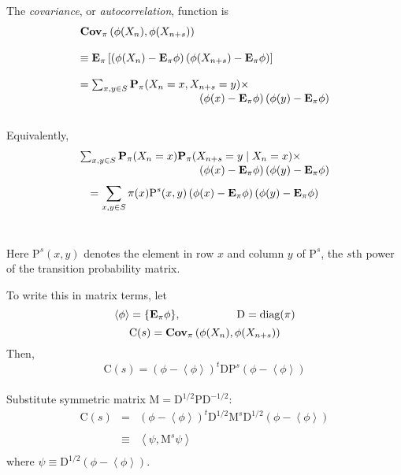 \documentclass{slides}
\newcommand{\Epi}{\mbox{{\bf E}}\ensuremath{_{\pi}}}
\newcommand{\Ppi}{\mbox{{\bf P}}\ensuremath{_{\pi}}}
\newcommand{\Cpi}{\mbox{{\bf Cov}}\ensuremath{_{\pi}}}
\newcommand{\M}{\mbox{M}}
\newcommand{\D}{\mbox{D}}
\newcommand{\Prob}{\mbox{P}}
\begin{document}
\begin{slide}
The {\it covariance}, or {\it autocorrelation}, function is
\begin{equation}
\begin{array}{l}
\Cpi \left(\phi(X_n),\phi(X_{n+s}) \right)
\\\\
\equiv \Epi\left[\left(\phi(X_n)-\Epi\phi\right)
\left(\phi(X_{n+s})-\Epi\phi\right)\right]
\\\\
= \sum_{x,y \in S} \Ppi(X_n=x, X_{n+s}=y)\times\\
\hspace{1.5 in} \left(\phi(x)-\Epi\phi\right) \left(\phi(y)-\Epi\phi \right)
\end{array}
\end{equation}
\\
Equivalently,\\
\[
\begin{array}{l}
\sum_{x,y \in S} \Ppi(X_n=x)\Ppi(X_{n+s}=y \mid X_n=x)\times \\
\hspace{1.5 in}\left(\phi(x)-\Epi\phi\right)\left(\phi(y)-\Epi\phi\right)
\end{array}
\]
\[
= \sum_{x,y \in S}\pi(x)\Prob^s(x,y)
\left(\phi(x)-\Epi\phi\right)\left(\phi(y)-\Epi\phi\right)
\]
\\
\end{slide}

\begin{note}
Here $\Prob^s(x,y)$ denotes the element in row $x$ and column $y$ of
$\Prob^s$,
the $s$th power of the transition probability matrix.
\end{note}

\begin{slide}
To write this in matrix terms, let \\
\[\left<\phi \right> = \{\Epi \phi\}, \hspace{.7 in} \D = \mbox{diag}(\pi)\]
\[\mbox{C}(s)= \Cpi \left(\phi(X_n),\phi(X_{n+s}) \right)\]
Then,
\[
{\mbox{C}(s)} = (\phi-\left<\phi \right>)^t \D \mbox{P}^s 
(\phi- \left<\phi \right>) 
\]
\\
Substitute symmetric matrix $\M = \D^{1/2}\Prob \D^{-1/2}$:
\begin{eqnarray*}
{\mbox{C}(s)}& =& (\phi-\left<\phi \right>)^t \D^{1/2}\M^s \D^{1/2}
(\phi- \left<\phi \right>) \\
& & \\
& \equiv & \left<\psi,\M^s \psi \right>\\
\end{eqnarray*}
where $\psi \equiv \D^{1/2}(\phi- \left<\phi \right>)$.\\
\end{slide}
\end{document}
